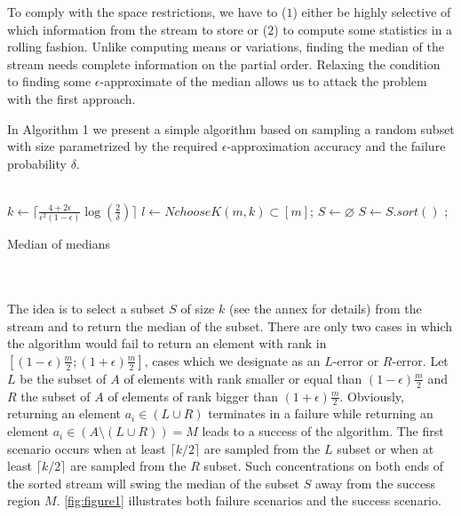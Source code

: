 \documentclass[10pt,usenames,dvipsnames]{article}
\newenvironment{exercise}[2][Exercise]{\begin{trivlist}
  \item[\hskip \labelsep {\bfseries #1}\hskip \labelsep {\bfseries #2.}]}{\end{trivlist}}
\begin{document}
\begin{exercise}{1}
    To comply with the space restrictions, we have to ($1$) either be highly selective
    of which information from the stream to store or ($2$) to compute some statistics
    in a rolling fashion. Unlike computing means or variations, finding the
    median of the stream needs complete information on the partial order.
    Relaxing the condition to finding some $\epsilon$-approximate of the median
    allows us to attack the problem with the first approach.

    In Algorithm 1 we present a simple algorithm based on sampling
    a random subset with size parametrized by the required $\epsilon$-approximation
    accuracy and the failure probability $\delta$.
\\ \\
\begin{algorithm}[H]
\SetAlgoLined
{}
 $k \leftarrow \lceil  \frac{4 + 2\epsilon}{\epsilon^2(1 - \epsilon)}
 \log(\frac{2}{\delta}) \rceil$\;
 $l \leftarrow NchooseK(m, k) \subset \left[ m \right]$;
 $S \leftarrow \varnothing$\;
$S \leftarrow S.sort()$\;
 ;
 \caption{Median of medians}
 \label{alg:algorithm1}
\end{algorithm}\mbox{}
 \\ \\
    The idea is to select a subset $S$ of size $k$ (see the annex for details) from the stream and to return
    the median of the subset. There are only two cases in which the algorithm
    would fail to return an element with rank in $\left[
      (1-\epsilon)\frac{m}{2}; (1+\epsilon) \frac{m}{2} \right]$, cases which we
    designate as an $L$-error or $R$-error. Let $L$ be the subset of $A$ of
    elements with rank smaller or equal than $(1 - \epsilon)\frac{m}{2}$ and $R$
    the subset of $A$ of elements of rank bigger than $(1 +
    \epsilon)\frac{m}{2}$. Obviously, returning an element $a_i \in (L \cup R)$
    terminates in a failure
    while returning an element $a_i \in (A \setminus (L \cup R)) = M$ leads to
    a success of the algorithm. The first scenario occurs when at least $\lceil k/2 \rceil$ are sampled from
    the $L$ subset or when at least $\lceil  k/2 \rceil$ are sampled from the
    $R$ subset. Such concentrations on both ends of the sorted stream will swing
    the median of the subset $S$ away from the success region $M$. 
    \autoref{fig:figure1} illustrates both failure scenarios and the success
    scenario.


\end{exercise}
\end{document}
